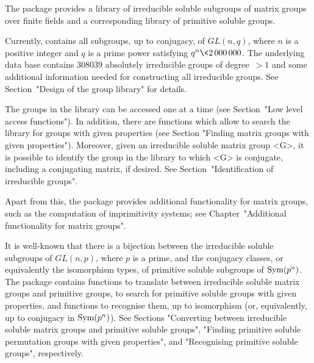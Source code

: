 



The package {\IRREDSOL} provides a library of irreducible
soluble subgroups of matrix groups over finite fields and a corresponding library of primitive soluble groups.

Currently, {\IRREDSOL} contains all subgroups, up to conjugacy, of $GL(n, q)$, 
where $n$ is a positive integer and $q$
is a prime power satisfying  $q^n \< 2\,000\,000$. The underlying data base contains 
$308039$ absolutely irreducible groups of degree~$> 1$ and some additional information
needed for constructing all irreducible groups. See Section~"Design of the group library"
for details.

The groups in the {\IRREDSOL} 
library can be accessed one at a time (see Section~"Low
level access functions"). In addition, there are functions which allow to 
search the library for groups with given properties (see Section "Finding
matrix groups with given properties"). Moreover, given an irreducible soluble matrix group
<G>, it is possible to identify the group in the library to which <G> is conjugate,
including a conjugating matrix, if desired. See Section~"Identification of irreducible
groups".

Apart from this, the {\IRREDSOL} package provides additional functionality
for matrix groups, such as the computation of imprimitivity systems;
see Chapter~"Additional functionality for matrix groups".

It is well-known that there is a bijection between the  irreducible soluble subgroups of
$GL(n, p)$, where
$p$ is a prime, and the conjugacy classes, or equivalently the isomorphism types, of
primitive soluble subgroups of ${\rm Sym}(p^n)$. The {\IRREDSOL} package contains
functions to translate between irreducible soluble matrix groups and primitive
groups, to search for primitive soluble groups with given  properties, and functions to
recognise them, up to isomorphism (or, equivalently, up to conjugacy in ${\rm Sym}(p^n)$).  See Sections "Converting between irreducible soluble
matrix groups and primitive soluble groups", "Finding primitive soluble permutation
groups with given properties", and "Recognising primitive soluble groups", respectively.

